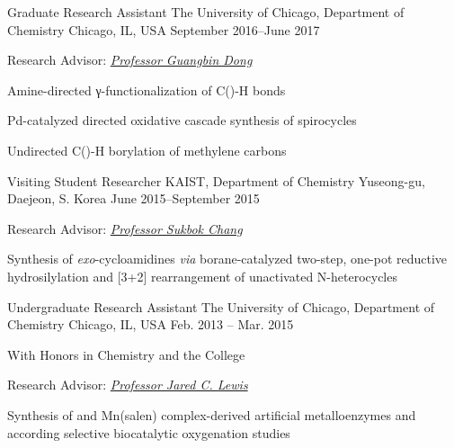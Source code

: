 

\begin{cventries}
	
	\cventry
	{Graduate Research Assistant} %
	{The University of Chicago, Department of Chemistry} %
	{Chicago, IL, USA} %
	{September 2016--June 2017} %
	{
		\begin{cvitems} %
			\item {Research Advisor: \emph{\href{https://donggroup-sites.uchicago.edu/page/about-guangbin}{Professor Guangbin Dong}}}
			\item Amine-directed γ-functionalization of C()-H bonds
			\item Pd-catalyzed directed oxidative cascade synthesis of spirocycles
			\item Undirected C()-H borylation of methylene carbons
		\end{cvitems}
	}
	
	\cventry
	{Visiting Student Researcher} %
	{KAIST, Department of Chemistry} %
	{Yuseong-gu, Daejeon, S. Korea} %
	{June 2015--September 2015} %
	{
		\begin{cvitems} %
			\item {Research Advisor: \emph{\href{http://sbchang.kaist.ac.kr/Professor}{Professor Sukbok Chang}}}
			\item Synthesis of \textit{exo}-cycloamidines \textit{via} borane-catalyzed two-step, one-pot reductive hydrosilylation and [3+2] rearrangement of unactivated N-heterocycles
		\end{cvitems}
	}
	
	\cventry
	{Undergraduate Research Assistant} %
	{The University of Chicago, Department of Chemistry} %
	{Chicago, IL, USA} %
	{Feb. 2013 -- Mar. 2015} %
	{
		\begin{cvitems} %
			\item {With Honors in Chemistry and the College}
			\item {Research Advisor: \emph{\href{http://lewislab.uchicago.edu/jclewis.html}{Professor Jared C. Lewis}}}
			\item Synthesis of  and Mn(salen) complex-derived artificial metalloenzymes and according selective biocatalytic oxygenation studies
		\end{cvitems}
	}
	
\end{cventries}